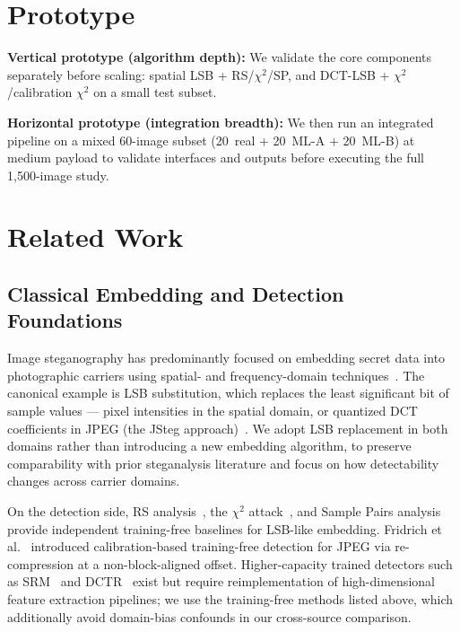 \documentclass[10pt,twocolumn,a4paper]{article}
\begin{document}
\section{Prototype}

\textbf{Vertical prototype (algorithm depth):} We validate the core components separately before scaling: spatial LSB + RS/$\chi^2$/SP, and DCT-LSB + $\chi^2$/calibration $\chi^2$ on a small test subset.

\textbf{Horizontal prototype (integration breadth):} We then run an integrated pipeline on a mixed 60-image subset (20~real + 20~ML-A + 20~ML-B) at medium payload to validate interfaces and outputs before executing the full 1{,}500-image study.

\section{Related Work}
\label{sec:relatedwork}

\subsection{Classical Embedding and Detection Foundations}
Image steganography has predominantly focused on embedding secret data into photographic carriers using spatial- and frequency-domain techniques~\cite{petitcolas1999,hussain2018}. The canonical example is LSB substitution, which replaces the least significant bit of sample values --- pixel intensities in the spatial domain, or quantized DCT coefficients in JPEG (the JSteg approach)~\cite{westfeld1999chi,fridrich2003calib}. We adopt LSB replacement in both domains rather than introducing a new embedding algorithm, to preserve comparability with prior steganalysis literature and focus on how detectability changes across carrier domains.

On the detection side, RS analysis~\cite{fridrich2001lsb}, the $\chi^2$ attack~\cite{westfeld1999chi}, and Sample Pairs analysis~\cite{dumitrescu2003sp} provide independent training-free baselines for LSB-like embedding. Fridrich et al.~\cite{fridrich2003calib} introduced calibration-based training-free detection for JPEG via re-compression at a non-block-aligned offset. Higher-capacity trained detectors such as SRM~\cite{fridrich2012srm} and DCTR~\cite{holub2015dctr} exist but require reimplementation of high-dimensional feature extraction pipelines; we use the training-free methods listed above, which additionally avoid domain-bias confounds in our cross-source comparison.
\end{document}

